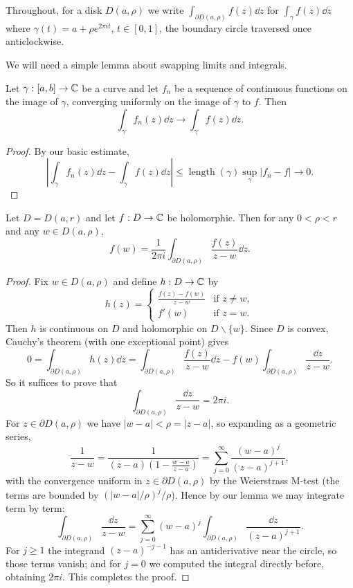 \documentclass[a4paper]{scrartcl}
\begin{document}
Throughout, for a disk $D(a, \rho)$ we write $\int_{\partial D(a, \rho)} f(z) \dd z$ for $\int_\gamma f(z) \dd z$ where $\gamma(t) = a + \rho e^{2 \pi i t}$, $t \in [0, 1]$, the boundary circle traversed once anticlockwise.

We will need a simple lemma about swapping limits and integrals.

\begin{lemma}
    Let $\gamma: [a, b] \rightarrow \mathbb{C}$ be a curve and let $f_n$ be a sequence of continuous functions on the image of $\gamma$, converging uniformly on the image of $\gamma$ to $f$. Then
    $$
    \int_\gamma f_n(z) \dd z \rightarrow \int_\gamma f(z) \dd z.
    $$
\end{lemma}
\begin{proof}
    By our basic estimate,
    \[
    \left|\int_\gamma f_n(z) \dd z - \int_\gamma f(z) \dd z \right| \leq \operatorname{length}(\gamma) \sup_{\gamma} |f_n - f| \rightarrow 0.
    \]
\end{proof}

\begin{theorem}
    Let $D = D(a, r)$ and let $f: D \rightarrow \mathbb{C}$ be holomorphic. Then for any $0 < \rho < r$ and any $w \in D(a, \rho)$,
    $$
    f(w) = \frac{1}{2 \pi i} \int_{\partial D(a, \rho)} \frac{f(z)}{z - w} \dd z.
    $$
\end{theorem}
\begin{proof}
    Fix $w \in D(a, \rho)$ and define $h: D \rightarrow \mathbb{C}$ by
    $$
    h(z) = \begin{cases}
        \frac{f(z) - f(w)}{z - w} &\mbox{if } z \neq w, \\
        f'(w) &\mbox{if } z = w.
       \end{cases}
    $$
    Then $h$ is continuous on $D$ and holomorphic on $D \backslash \{w\}$. Since $D$ is convex, Cauchy's theorem (with one exceptional point) gives
    $$
    0 = \int_{\partial D(a, \rho)} h(z) \dd z = \int_{\partial D(a, \rho)} \frac{f(z)}{z - w} \dd z - f(w)\int_{\partial D(a, \rho)} \frac{\dd z}{z - w}.
    $$
    So it suffices to prove that
    $$
    \int_{\partial D(a, \rho)} \frac{\dd z}{z - w} = 2 \pi i.
    $$
    For $z \in \partial D(a, \rho)$ we have $|w - a| < \rho = |z - a|$, so expanding as a geometric series,
    $$
    \frac{1}{z - w} = \frac{1}{(z - a)\left(1 - \frac{w - a}{z - a}\right)} = \sum_{j = 0}^{\infty} \frac{(w - a)^j}{(z - a)^{j + 1}},
    $$
    with the convergence uniform in $z \in \partial D(a, \rho)$ by the Weierstrass M-test (the terms are bounded by $(|w - a|/\rho)^j / \rho$). Hence by our lemma we may integrate term by term:
    $$
    \int_{\partial D(a, \rho)} \frac{\dd z}{z - w} = \sum_{j = 0}^{\infty} (w - a)^j \int_{\partial D(a, \rho)} \frac{\dd z}{(z - a)^{j + 1}}.
    $$
    For $j \geq 1$ the integrand $(z - a)^{-j - 1}$ has an antiderivative near the circle, so those terms vanish; and for $j = 0$ we computed the integral directly before, obtaining $2 \pi i$. This completes the proof.
\end{proof}
\end{document}
